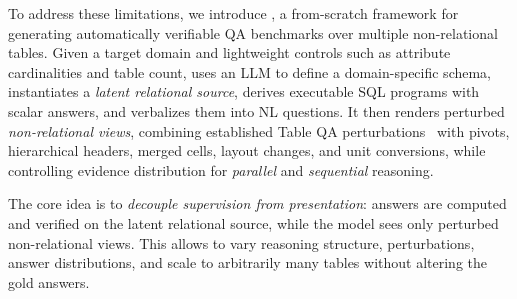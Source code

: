 To address these limitations, we introduce \name, a from-scratch framework for generating automatically verifiable QA benchmarks over multiple non-relational tables. Given a target domain and lightweight controls such as attribute cardinalities and table count, \name uses an LLM to define a domain-specific schema, instantiates a \emph{latent relational source}, derives executable SQL programs with scalar answers, and verbalizes them into NL questions. It then renders perturbed \emph{non-relational views}, combining established Table QA perturbations~\cite{2.4,2.5,2.6,2.8} with pivots, hierarchical headers, merged cells, layout changes, and unit conversions, while controlling evidence distribution for \emph{parallel} and \emph{sequential} reasoning.


The core idea is to \emph{decouple supervision from presentation}: answers are computed and verified on the latent relational source, while the model sees only perturbed non-relational views. This allows \name to vary reasoning structure, perturbations, answer distributions, and scale to arbitrarily many tables without altering the gold answers.

